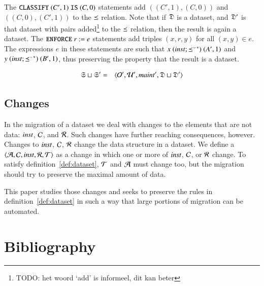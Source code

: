 \documentclass{elsarticle}
\begin{document}
The ${\tt CLASSIFY\ }(C',1){\tt\ IS\ }(C,0)$ statements add $((C',1),(C,0))$ and  $((C,0),(C',1))$ to the $\preceq$ relation. Note that if $\mathfrak{D}$ is a dataset, and $\mathfrak{D}'$ is that dataset with pairs added\footnote{TODO: het woord `add' is informeel, dit kan beter} to the $\preceq$ relation, then the result is again a dataset.
The ${\tt ENFORCE\ }r{\tt\ :=\ }e$ statements add triples $(x,r,y)$ for all $(x,y)\in e$.
The expressions $e$ in these statements are such that $x\ (\text{\it inst\/} ; {{\preceq}^\smallsmile}^*)\ (A',1)$ and $y \ (\inst \compose \kleenestar{\flip{\isa}})\ (B',1)$, thus preserving the property that the result is a dataset.

\begin{definition}[]
   \begin{eqnarray}
      \mathfrak{S}\sqcup\mathfrak{S}'&=&\langle\mathcal{O}',\mathcal{U}',\text{\it maint\/}',\mathfrak{D}\sqcup\mathfrak{D}'\rangle
   \end{eqnarray}
\end{definition}

\subsection{Changes}
   In the migration of a dataset we deal with changes to the elements that are not data:
   $\text{\it inst\/}$, $\mathcal{C}$, and $\mathcal{R}$.
   Such changes have further reaching consequences, however.
   Changes to $\text{\it inst\/}$, $\mathcal{C}$, $\mathcal{R}$ change the data structure in a dataset.
   We define a  $\langle\mathcal{A},\mathcal{C},\text{\it inst\/},\mathcal{R},\mathcal{T}\rangle$ as a change in which one or more of $\text{\it inst\/}$, $\mathcal{C}$, or $\mathcal{R}$ change.
   To satisfy definition~\ref{def:dataset}, $\mathcal{T}$ and $\mathcal{A}$ must change too,
   but the migration should try to preserve the maximal amount of data.

   This paper studies those changes and seeks to preserve the rules in definition~\ref{def:dataset}
   in such a way that large portions of migration can be automated.


\section{Bibliography}


\end{document}
